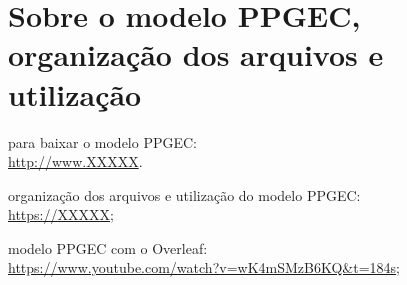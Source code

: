 \section{Sobre o modelo PPGEC, organização dos arquivos e utilização}
\begin{alineas}

	\item para baixar o modelo PPGEC: \\ \url{http://www.XXXXX}.

	\item organização dos arquivos e utilização do modelo PPGEC:\\ \url{https://XXXXX};

	\item modelo PPGEC com o Overleaf:\\ \url{https://www.youtube.com/watch?v=wK4mSMzB6KQ&t=184s};
	
\end{alineas}



